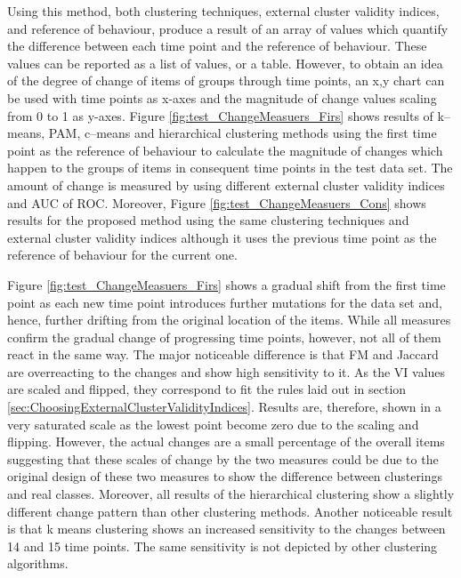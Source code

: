 Using this method, both clustering techniques, external cluster validity indices, and reference of behaviour, produce a result of an array of values which quantify the difference between each time point and the reference of behaviour. These values can be reported as a list of values, or a table. However, to obtain an idea of the degree of change of items of groups through time points, an x,y chart can be used with time points as x-axes and the magnitude of change values scaling from 0 to 1 as y-axes. Figure \ref{fig:test_ChangeMeasuers_Firs} shows results of k--means, PAM, c--means and hierarchical clustering methods using the first time point as the reference of behaviour to calculate the magnitude of changes which happen to the groups of items in consequent time points in the test data set. The amount of change is measured by using different external cluster validity indices and AUC of ROC. Moreover, Figure \ref{fig:test_ChangeMeasuers_Cons} shows results for the proposed method using the same clustering techniques and external cluster validity indices although it uses the previous time point as the reference of behaviour for the current one.

Figure \ref{fig:test_ChangeMeasuers_Firs} shows a gradual shift from the first time point as each new time point introduces further mutations for the data set and, hence, further drifting from the original location of the items. While all measures confirm the gradual change of progressing time points, however, not all of them react in the same way. The major noticeable difference is that FM and Jaccard are overreacting to the changes and show high sensitivity to it. As the VI values are scaled and flipped, they correspond to fit the rules laid out in section  \ref{sec:ChoosingExternalClusterValidityIndices}. Results are, therefore, shown in a very saturated scale as the lowest point become zero due to the scaling and flipping. However, the actual changes are a small percentage of the overall items suggesting that these scales of change by the two measures could be due to the original design of these two measures to show the difference between clusterings and real classes. Moreover, all results of the hierarchical clustering show a slightly different change pattern than other clustering methods. Another noticeable result is that k means clustering shows an increased sensitivity to the changes between 14 and 15 time points. The same sensitivity is not depicted by other clustering algorithms.
         
